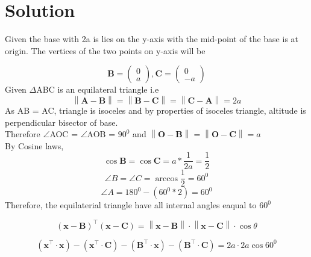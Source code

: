\documentclass[journal,12pt,twocolumn]{IEEEtran}
\providecommand{\norm}[1]{\left\lVert#1\right\rVert}
\let\vec\mathbf
\providecommand{\brak}[1]{\ensuremath{\left(#1\right)}}
\begin{document}
\section{Solution}
\noindent Given the base with 2a is lies on the y-axis with the mid-point of the base is at origin. The vertices of the two points on y-axis will be

\begin{equation}
\vec{B}=\begin{pmatrix} 
0\\
a
\end{pmatrix}, {
\vec{C}=\begin{pmatrix} 
0\\
-a
\end{pmatrix} }
\end{equation}
\noindent Given $\Delta$ABC is an equilateral triangle i.e 
\begin{equation}
 \norm{\vec{A}-\vec{B}}= \norm{\vec{B}-\vec{C}}= \norm{\vec{C}-\vec{A}} =2a
\end{equation}
\noindent As AB = AC, triangle is isoceles and by properties of isoceles triangle, altitude is perpendicular bisector of base.\\

\noindent Therefore $\angle$AOC = $\angle$AOB = $90^0$ and $\norm{\vec{O}-\vec{B}}= \norm{\vec{O}-\vec{C}}= a$ \\

\noindent By Cosine laws,
\begin{equation}
\cos\vec{B} = \cos\vec{C} = a* \frac{1}{2a} = \frac{1}{2}
\end{equation}
\begin{equation}
\angle B = \angle C = \arccos\frac{1}{2} = 60^0
\end{equation}
 \begin{equation}
 \angle A = 180^0 -(60^0 * 2) = 60^0
  \end{equation}
\noindent Therefore, the equilaterial triangle have all internal angles eaqual to  $60^0$ 

 \begin{equation}  
  \brak{\vec{x}-\vec{B}}^{\top} \brak{\vec{x}-\vec{C}}= \norm{\vec{x}-\vec{B}} \cdot \norm{\vec{x}-\vec{C}} \cdot \cos\theta 
 \end{equation}
 
 \begin{equation}  
\brak{\vec{x}^\top \cdot \vec{x}} - \brak{\vec{x}^\top \cdot \vec{C}} - \brak{\vec{B}^\top \cdot \vec{x}} - \brak{\vec{B}^\top \cdot \vec{C}} = 2a \cdot 2a \cos 60^0   
 \end{equation}
\end{document}
